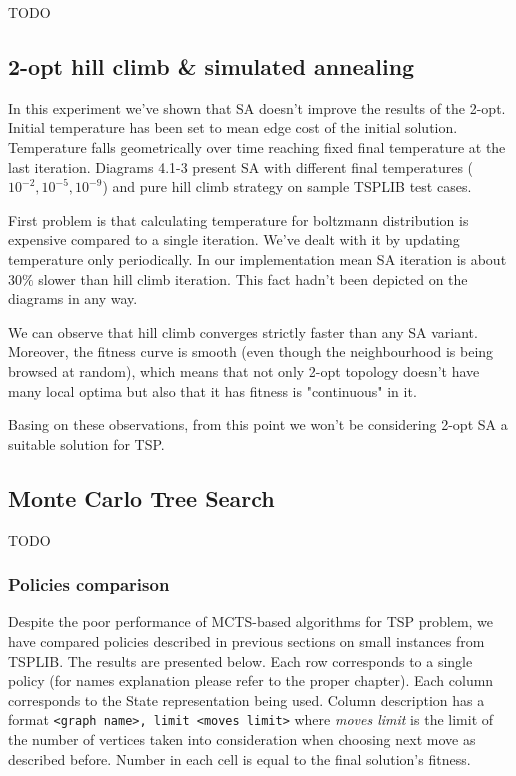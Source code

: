 TODO

\subsection { 2-opt hill climb \& simulated annealing }

In this experiment we've shown that SA doesn't improve the results of the 2-opt.
Initial temperature has been set to mean edge cost of the initial solution.
Temperature falls geometrically over time reaching fixed final temperature at the last iteration.
Diagrams 4.1-3 present SA with different final temperatures ($10^{-2}, 10^{-5}, 10^{-9}$) and
pure hill climb strategy on sample TSPLIB test cases.





First problem is that calculating temperature for boltzmann distribution is
expensive compared to a single iteration. We've dealt with it by updating temperature
only periodically. In our implementation mean SA iteration is about $30\%$ slower than
hill climb iteration. This fact hadn't been depicted on the diagrams in any way.

We can observe that hill climb converges strictly faster than any SA variant.
Moreover, the fitness curve is smooth (even though the neighbourhood is being browsed at random),
which means that not only 2-opt topology doesn't have many local optima but also that it has fitness
is "continuous" in it.

Basing on these observations, from this point we won't be considering 2-opt SA a
suitable solution for TSP.

\subsection{Monte Carlo Tree Search}

TODO %

\subsubsection{Policies comparison}

Despite the poor performance of MCTS-based algorithms for TSP problem, we have
compared policies described in previous sections on small instances from
TSPLIB. The results are presented below. Each row corresponds to a single
policy (for names explanation please refer to the proper chapter). Each column
corresponds to the State representation being used. Column description has a
format \verb+<graph name>, limit <moves limit>+ where \emph{moves limit} is
the limit of the number of vertices taken into consideration when choosing next
move as described before. Number in each cell is equal to the final solution's
fitness.

